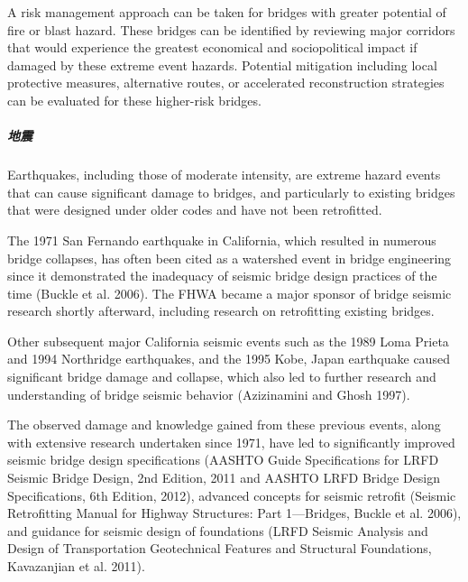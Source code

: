 A risk management approach can be taken for bridges with greater potential of fire or blast hazard. These
bridges can be identified by reviewing major corridors that would experience the greatest economical and sociopolitical
impact if damaged by these extreme event hazards. Potential mitigation including local protective measures,
alternative routes, or accelerated reconstruction strategies can be evaluated for these higher-risk bridges.

\subparagraph{地震}
\label{subpar:seismic}

Earthquakes, including those of moderate intensity, are extreme hazard events that can cause significant damage
to bridges, and particularly to existing bridges that were designed under older codes and have not been retrofitted.

The 1971 San Fernando earthquake in California, which resulted in numerous bridge collapses, has often been
cited as a watershed event in bridge engineering since it demonstrated the inadequacy of seismic bridge design practices of the time (Buckle et al. 2006). The FHWA became a major sponsor of bridge seismic research shortly
afterward, including research on retrofitting existing bridges.

Other subsequent major California seismic events such as the 1989 Loma Prieta and 1994 Northridge
earthquakes, and the 1995 Kobe, Japan earthquake caused significant bridge damage and collapse, which also led to
further research and understanding of bridge seismic behavior (Azizinamini and Ghosh 1997).

The observed damage and knowledge gained from these previous events, along with extensive research
undertaken since 1971, have led to significantly improved seismic bridge design specifications (AASHTO Guide
Specifications for LRFD Seismic Bridge Design, 2nd Edition, 2011 and AASHTO LRFD Bridge Design Specifications,
6th Edition, 2012), advanced concepts for seismic retrofit (Seismic Retrofitting Manual for Highway Structures: Part
1—Bridges, Buckle et al. 2006), and guidance for seismic design of foundations (LRFD Seismic Analysis and Design
of Transportation Geotechnical Features and Structural Foundations, Kavazanjian et al. 2011).

